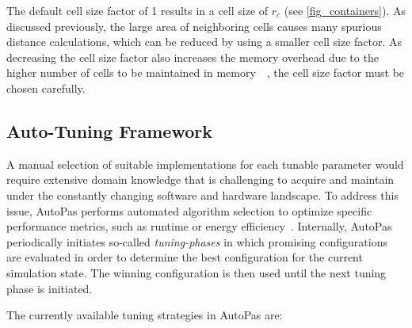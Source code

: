 \documentclass[conference]{IEEEtran}
\begin{document}
\begin{description}[style=nextline]
    \item[Cell Size Factor]
        The default cell size factor of 1 results in a cell size of $r_c$ (see \autoref{fig_containers}). As discussed previously, the large area of neighboring cells causes many spurious distance calculations, which can be reduced by using a smaller cell size factor. As decreasing the cell size factor also increases the memory overhead due to the higher number of cells to be maintained in memory~\cite{menges2019}~\cite{Papula2020}, the cell size factor must be chosen carefully.
\end{description}


\subsection{Auto-Tuning Framework}

A manual selection of suitable implementations for each tunable parameter would require extensive domain knowledge that is challenging to acquire and maintain under the constantly changing software and hardware landscape. To address this issue, AutoPas performs automated algorithm selection to optimize specific performance metrics, such as runtime or energy efficiency~\cite{Gratl2022AutoPas}. Internally, AutoPas periodically initiates so-called \textit{tuning-phases} in which promising configurations are evaluated in order to determine the best configuration for the current simulation state. The winning configuration is then used until the next tuning phase is initiated.

The currently available tuning strategies in AutoPas are:
\end{document}
